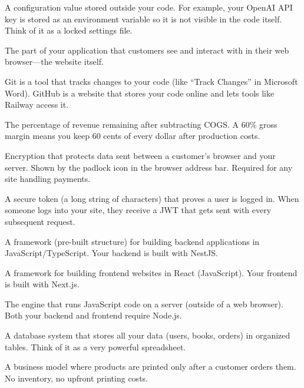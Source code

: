 \documentclass[12pt, letterpaper, oneside]{book}
\begin{document}
\begin{description}[style=nextline, leftmargin=2em, itemsep=6pt]
\item[Environment Variable]
A configuration value stored outside your code. For example, your OpenAI API key is stored as an environment variable so it is not visible in the code itself. Think of it as a locked settings file.

\item[Frontend]
The part of your application that customers see and interact with in their web browser---the website itself.

\item[Git / GitHub]
Git is a tool that tracks changes to your code (like ``Track Changes'' in Microsoft Word). GitHub is a website that stores your code online and lets tools like Railway access it.

\item[Gross Margin]
The percentage of revenue remaining after subtracting COGS. A 60\% gross margin means you keep 60 cents of every dollar after production costs.

\item[HTTPS / SSL / TLS]
Encryption that protects data sent between a customer's browser and your server. Shown by the padlock icon in the browser address bar. Required for any site handling payments.

\item[JWT (JSON Web Token)]
A secure token (a long string of characters) that proves a user is logged in. When someone logs into your site, they receive a JWT that gets sent with every subsequent request.

\item[NestJS]
A framework (pre-built structure) for building backend applications in JavaScript/TypeScript. Your backend is built with NestJS.

\item[Next.js]
A framework for building frontend websites in React (JavaScript). Your frontend is built with Next.js.

\item[Node.js]
The engine that runs JavaScript code on a server (outside of a web browser). Both your backend and frontend require Node.js.

\item[PostgreSQL]
A database system that stores all your data (users, books, orders) in organized tables. Think of it as a very powerful spreadsheet.

\item[Print-on-Demand (POD)]
A business model where products are printed only after a customer orders them. No inventory, no upfront printing costs.


\end{description}
\end{document}
